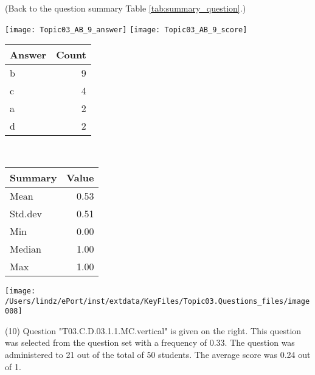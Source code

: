 \documentclass[12pt,english,nohyper]{tufte-handout}\usepackage[]{graphicx}\usepackage[]{color}
\begin{document}
 (Back to the question summary Table \ref{tab:summary_question}.)

\begin{center} \texttt{[image: Topic03\_AB\_9\_answer]} \texttt{[image: Topic03\_AB\_9\_score]} \end{center} 

\begin{center}%
\begin{tabular}{lr}
  \hline
Answer & Count \\ 
  \hline
b &   9 \\ 
  c &   4 \\ 
  a &   2 \\ 
  d &   2 \\ 
   \hline
\end{tabular}
~~~~~~~~%
\begin{tabular}{lr}
  \hline
Summary & Value \\ 
  \hline
Mean & 0.53 \\ 
  Std.dev & 0.51 \\ 
  Min & 0.00 \\ 
  Median & 1.00 \\ 
  Max & 1.00 \\ 
   \hline
\end{tabular}
\end{center}\newpage{}



\vspace{5cm}\begin{marginfigure}\texttt{[image: /Users/lindz/ePort/inst/extdata/KeyFiles/Topic03.Questions\_files/image008]}\end{marginfigure}\vspace{-5cm} (10) Question "T03.C.D.03.1.1.MC.vertical" is given on the right. This question was selected from the question set with a frequency of 0.33. The question was administered to 21 out of the total of 50 students. The average score was 0.24 out of 1.
\end{document}
